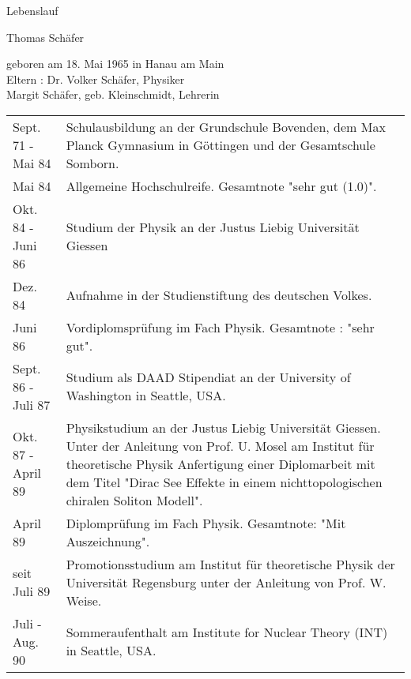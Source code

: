 \pagestyle{empty}
\hoffset-1.5cm
\textwidth15cm

\baselineskip18pt
\parskip0pt
\vspace{1cm}
\centerline{\huge \rm Lebenslauf}
\vspace{0.8cm}
\centerline{\Large \rm Thomas Sch\"afer}
\vspace{0.8cm}
\begin{center}
\begin{minipage}{8cm}
geboren am 18. Mai 1965 in Hanau am Main \\
Eltern : Dr. Volker Sch\"afer, Physiker \\
Margit Sch\"afer, geb. Kleinschmidt, Lehrerin
\end{minipage}
\end{center}

\vspace{2cm}
\begin{tabular}{lp{11cm}}
Sept. 71 - Mai 84     &  Schulausbildung an der Grundschule Bovenden, dem 
                         Max Planck Gymnasium in G\"ottingen und der 
			 Gesamtschule Somborn. \\
Mai 84                &  Allgemeine Hochschulreife. Gesamtnote
                         "sehr gut (1.0)". \\			  
Okt. 84 - Juni 86     &  Studium der Physik an der Justus Liebig Universit\"at
                         Giessen\\
Dez. 84               &  Aufnahme in der Studienstiftung des deutschen Volkes.\\		 
Juni 86               &  Vordiplomspr\"ufung im Fach Physik. Gesamtnote :
                         "sehr gut". \\ 			 
Sept. 86 - Juli 87    &  Studium als DAAD Stipendiat an der University of
                         Washington in Seattle, USA. \\
Okt. 87 - April 89    &  Physikstudium an der Justus Liebig Universit\"at
                         Giessen. Unter der Anleitung von Prof. U. Mosel am
		         Institut f\"ur theoretische Physik Anfertigung
			 einer Diplomarbeit mit dem Titel "Dirac See Effekte
		         in einem nichttopologischen chiralen  Soliton Modell".\\
April 89              &  Diplompr\"ufung im Fach Physik. Gesamtnote: 
                         "Mit Auszeichnung". \\			 
seit Juli 89          &  Promotionsstudium am Institut f\"ur theoretische 
                         Physik der Universit\"at Regensburg unter der
			 Anleitung von Prof. W. Weise. \\
Juli - Aug. 90        &  Sommeraufenthalt am Institute for Nuclear
                         Theory (INT) in Seattle, USA.			 
\end{tabular}

